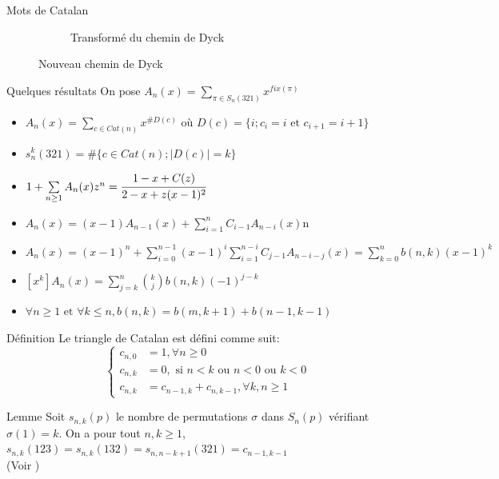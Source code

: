 \begin{frame}{Mots de Catalan}
\begin{figure}[h!]
\begin{subfigure}[b]{0.38\textwidth}
            \caption{Transformé du chemin de Dyck}
        \end{subfigure}
        \caption{Nouveau chemin de Dyck}
        \label{fig:DyckPath}
    \end{figure}
    
\end{frame}

\begin{frame}[t]{Quelques résultats}
    On pose $A_{n}(x)=\sum\limits_{\pi \in S_{n}(321)}x^{fix(\pi)}$
    \transfade
    \begin{itemize}
        \item $A_{n}(x)=\sum\limits_{c \in Cat(n)}x^{\#D(c)}$ où $D(c)=\{i; c_{i}=i \text{ et }c_{i+1}=i+1\}$
        \pause
        \item $s_{n}^{k}(321)=\#\{c\in Cat(n); |D(c)|=k\}$
        \pause
        \item $1+\sum\limits_{n\geq 1}A_{n}(x)z^{n}=\cfrac{1-x+C(z)}{2-x+z(x-1)^{2}}$
        \pause
        \item $A_{n}(x) = (x-1)A_{n-1}(x) + \sum\limits_{i=1}^{n}C_{i-1}A_{n-i}(x)$n
        \pause
        \item $A_{n}(x)=(x-1)^{n}+\sum\limits_{i=0}^{n-1}(x-1)^{i}\sum\limits_{i=1}^{n-i}C_{j-1}A_{n-i-j}(x)=\sum\limits_{k=0}^{n}b(n,k)(x-1)^{k}$
        \pause
        \item $[x^{k}]A_{n}(x)=\sum\limits_{j=k}^{n}\binom{k}{j}b(n,k)(-1)^{j-k}$
        \pause
        \item $\forall n\geq 1 \text{ et }\forall k\leq n, b(n, k) = b(m, k+1) + b(n-1, k-1)$

    \end{itemize}
\end{frame}

\begin{frame}
    \transfade
    \begin{block}{Définition}
        Le triangle de Catalan est défini comme suit:
        $$
            \begin{cases}
                c_{n, 0} & = 1, \forall n\geq 0                                 \\
                c_{n, k} & = 0, \text{ si } n<k \text{ ou } n<0 \text{ ou } k<0 \\
                c_{n, k} & = c_{n-1, k} + c_{n, k-1}, \forall k, n \geq 1
            \end{cases}
        $$
    \end{block}
    \pause
    \begin{block}{Lemme}
        Soit $s_{n, k} (p)$ le nombre de permutations $\sigma$ dans $S_{n}(p)$ vérifiant $\sigma(1)=k$. On a pour tout $n, k \geq 1$, $s_{n,k}(123) = s_{n,k}(132) = s_{n, n-k+1}(321) = c_{n-1, k-1}$\\ (Voir \cite{Desantis})
    \end{block}
\end{frame}

